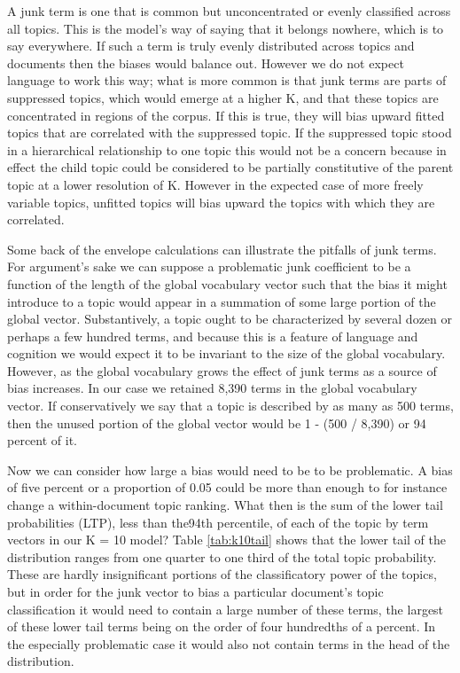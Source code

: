 \documentclass[]{book}
\theoremstyle{definition}
\theoremstyle{definition}
\theoremstyle{definition}
\theoremstyle{remark}
\begin{document}
A junk term is one that is common but unconcentrated or evenly
classified across all topics. This is the model's way of saying that it
belongs nowhere, which is to say everywhere. If such a term is truly
evenly distributed across topics and documents then the biases would
balance out. However we do not expect language to work this way; what is
more common is that junk terms are parts of suppressed topics, which
would emerge at a higher K, and that these topics are concentrated in
regions of the corpus. If this is true, they will bias upward fitted
topics that are correlated with the suppressed topic. If the suppressed
topic stood in a hierarchical relationship to one topic this would not
be a concern because in effect the child topic could be considered to be
partially constitutive of the parent topic at a lower resolution of K.
However in the expected case of more freely variable topics, unfitted
topics will bias upward the topics with which they are correlated.

Some back of the envelope calculations can illustrate the pitfalls of
junk terms. For argument's sake we can suppose a problematic junk
coefficient to be a function of the length of the global vocabulary
vector such that the bias it might introduce to a topic would appear in
a summation of some large portion of the global vector. Substantively, a
topic ought to be characterized by several dozen or perhaps a few
hundred terms, and because this is a feature of language and cognition
we would expect it to be invariant to the size of the global vocabulary.
However, as the global vocabulary grows the effect of junk terms as a
source of bias increases. In our case we retained 8,390 terms in the
global vocabulary vector. If conservatively we say that a topic is
described by as many as 500 terms, then the unused portion of the global
vector would be 1 - (500 / 8,390) or 94 percent of it.

Now we can consider how large a bias would need to be to be problematic.
A bias of five percent or a proportion of 0.05 could be more than enough
to for instance change a within-document topic ranking. What then is the
sum of the lower tail probabilities (LTP), less than the94th percentile,
of each of the topic by term vectors in our K = 10 model? Table
\ref{tab:k10tail} shows that the lower tail of the distribution ranges
from one quarter to one third of the total topic probability. These are
hardly insignificant portions of the classificatory power of the topics,
but in order for the junk vector to bias a particular document's topic
classification it would need to contain a large number of these terms,
the largest of these lower tail terms being on the order of four
hundredths of a percent. In the especially problematic case it would
also not contain terms in the head of the distribution.
\end{document}
